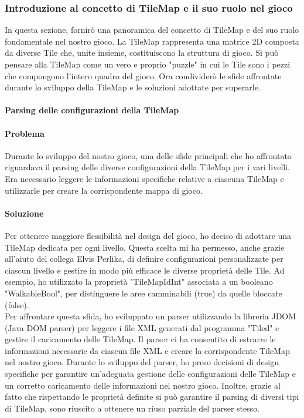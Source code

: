 \documentclass[a4paper,12pt]{report}
\begin{document}
\subsubsection*{Introduzione al concetto di TileMap e il suo ruolo nel gioco}
In questa sezione, fornirò una panoramica del concetto di TileMap e del suo ruolo fondamentale nel nostro gioco. 
La TileMap rappresenta una matrice 2D composta da diverse Tile che, unite insieme, costituiscono la struttura di gioco. 
Si può pensare alla TileMap come un vero e proprio "puzzle" in cui le Tile sono i pezzi che compongono l'intero quadro del gioco. 
Ora condividerò le sfide affrontate durante lo sviluppo della TileMap e le soluzioni adottate per superarle.
\paragraph*{Parsing delle configurazioni della TileMap}
\paragraph{Problema}
Durante lo sviluppo del nostro gioco, una delle sfide principali che ho affrontato riguardava il parsing delle diverse configurazioni della TileMap per i vari livelli. 
Era necessario leggere le informazioni specifiche relative a ciascuna TileMap e utilizzarle per creare la corrispondente mappa di gioco.
\paragraph{Soluzione}
Per ottenere maggiore flessibilità nel design del gioco, ho deciso di adottare una TileMap dedicata per ogni livello. 
Questa scelta mi ha permesso, anche grazie all'aiuto del collega Elvis Perlika, di definire configurazioni personalizzate per ciascun livello e gestire in modo più efficace le diverse proprietà delle Tile.
Ad esempio, ho utilizzato la proprietà "TileMapIdInt" associata a un booleano "WalkableBool", per distinguere le aree camminabili (true) da quelle bloccate (false).
\\
Per affrontare questa sfida, ho sviluppato un parser utilizzando la libreria JDOM (Java DOM parser) per leggere i file XML generati dal programma "Tiled" e gestire il caricamento delle TileMap.
Il parser ci ha consentito di estrarre le informazioni necessarie da ciascun file XML e creare la corrispondente TileMap nel nostro gioco.
Durante lo sviluppo del parser, ho preso decisioni di design specifiche per garantire un'adeguata gestione delle configurazioni delle TileMap e un corretto caricamento delle informazioni nel nostro gioco.
Inoltre, grazie al fatto che rispettando le proprietà definite si può garantire il parsing di diversi tipi di TileMap, sono riuscito a ottenere un riuso parziale del parser stesso.
\end{document}

